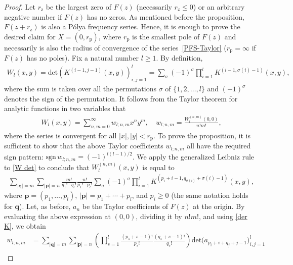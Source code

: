 \documentclass[10pt,a4paper]{amsart}
\newcommand{\sgn}{\mathrm{sgn}}
\renewcommand{\det}{\mathrm{det}}
\begin{document}
\begin{proof}
Let \( r_{\mathrm z} \) be the largest zero of \( F(z) \) (necessarily \( r_{\mathrm z}\leq0 \)) or an arbitrary negative number if \( F(z) \) has no zeros. As mentioned before the proposition, \( F(z+r_{\mathrm z})\) is also a P\'olya frequency series. Hence, it is enough to prove the desired claim for \( X=(0,r_{\mathrm p})\), where \( r_{\mathrm p} \) is the smallest pole of \( F(z) \) and necessarily is also the radius of convergence of the series~\eqref{PFS-Taylor} (\( r_{\mathrm p}=\infty \) if \( F(z)\) has no poles). Fix a natural number \( l\geq 1 \). By definition, 
\begin{align}
\label{W det}
W_l(x,y) = \det\left( K^{(i-1,j-1)}(x,y)\right)_{i,j=1}^l = \sum_\sigma (-1)^\sigma \prod_{i=1}^l K^{(i-1,\sigma(i)-1)}(x,y),
\end{align}
where the sum is taken over all the permutations \( \sigma \) of \( \{1,2,\ldots,l\} \) and \( (-1)^\sigma \) denotes the sign of the permutation. It follows from the Taylor theorem for analytic functions in two variables that 
\begin{align}
\label{W Taylor}
W_l(x,y) = \sum_{n,m=0}^\infty w_{l;n,m}x^ny^m, \quad w_{l;n,m} = \frac{W_l^{(n,m)}(0,0)}{n!m!},
\end{align}
where the series is convergent for all \( |x|,|y|<r_{\mathrm p} \). To prove the proposition, it is sufficient to show that the above Taylor coefficients \( w_{l;n,m} \) all have the required sign pattern: $\sgn \,w_{l;n,m}=(-1)^{l(l-1)/2}$. We apply the generalized Leibniz rule to \eqref{W det} to conclude  that \( W_l^{(n,m)}(x,y) \) is equal to
\begin{align}
\sum_{|\boldsymbol q|=m}\sum_{|\boldsymbol p|=n}\frac{m!}{q_1!\cdots q_l!}\frac{n!}{p_1!\cdots p_l!}\sum_\sigma (-1)^\sigma \prod_{i=1}^l K^{(p_i+i-1, q_{\sigma(i)} + \sigma(i) -1)}(x,y),
\end{align}
where \( \boldsymbol p=(p_1,\ldots,p_l) \), \( |\boldsymbol p|=p_1 + \cdots + p_l\), and \( p_i\geq 0 \) (the same notation holds for \( \boldsymbol q\)). Let, as before, \( a_n \) be the Taylor coefficients of \( F(z) \) at the origin. By evaluating the above expression at \( (0,0) \), dividing it by \( n!m! \), and using \eqref{der K}, we obtain
\begin{align}
w_{l;n,m} &= \sum_{|\boldsymbol q|=m}\sum_{|\boldsymbol p|=n} \left(\prod_{s=1}^l \frac{(p_s+s-1)!}{p_s!}\frac{(q_s+s-1)!}{q_s!}\right) \det\big(a_{p_i+i+q_j+j-1}\big)_{i,j=1}^l \\

\end{align}
\end{proof}
\end{document}

